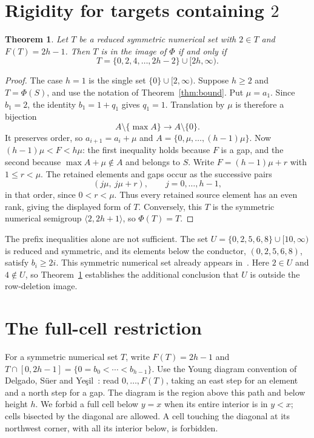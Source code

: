 \documentclass[11pt,a4paper]{article}
\newtheorem{theorem}{Theorem}
\theoremstyle{definition}
\theoremstyle{remark}
\begin{document}
\section{Rigidity for targets containing \texorpdfstring{$2$}{2}}
\begin{theorem}\label{thm:two}
Let $T$ be a reduced symmetric numerical set with $2\in T$ and
$F(T)=2h-1$. Then $T$ is in the image of $\Phi$ if and only if
\[
 T=\{0,2,4,\ldots,2h-2\}\cup[2h,\infty).
\]
\end{theorem}
\begin{proof}
The case $h=1$ is the single set $\{0\}\cup[2,\infty)$.
Suppose $h\geq2$ and $T=\Phi(S)$, and use the notation of
Theorem~\ref{thm:bound}. Put $\mu=a_1$. Since $b_1=2$, the identity
$b_1=1+q_1$ gives $q_1=1$. Translation by $\mu$ is therefore a bijection
\[
 A\setminus\{\max A\}\longrightarrow A\setminus\{0\}.
\]
It preserves order, so $a_{i+1}=a_i+\mu$ and
$A=\{0,\mu,\ldots,(h-1)\mu\}$.
Now $(h-1)\mu<F<h\mu$: the first inequality holds because $F$ is a gap,
and the second because $\max A+\mu\notin A$ and belongs to $S$.
Write $F=(h-1)\mu+r$ with $1\leq r<\mu$.
The retained elements and gaps occur as the successive pairs
\[
 (j\mu,\ j\mu+r),\qquad j=0,\ldots,h-1,
\]
in that order, since $0<r<\mu$.
Thus every retained source element has an even rank, giving the displayed
form of $T$. Conversely, this $T$ is the symmetric numerical semigroup
$\langle2,2h+1\rangle$, so $\Phi(T)=T$.
\end{proof}

The prefix inequalities alone are not sufficient. The set
$U=\{0,2,5,6,8\}\cup[10,\infty)$ is reduced and symmetric, and its
elements below the conductor, $(0,2,5,6,8)$, satisfy $b_i\geq2i$.
This symmetric numerical set already appears in~\cite[Example~5.3]{Y}.
Here $2\in U$ and $4\notin U$, so Theorem~\ref{thm:two} establishes
the additional conclusion that $U$ is outside the row-deletion image.


\section{The full-cell restriction}\label{sec:cells}
For a symmetric numerical set $T$, write $F(T)=2h-1$ and
$T\cap[0,2h-1]=\{0=b_0<\cdots<b_{h-1}\}$.
Use the Young diagram convention of Delgado, S\"uer and
Ye\c{s}il~\cite[Section~2, p.~4]{DSY}: read $0,\ldots,F(T)$,
taking an east step for an element and a north step for a gap.
The diagram is the region above this path and below height $h$.
We forbid a full cell below $y=x$ when its entire interior is in $y<x$;
cells bisected by the diagonal are allowed. A cell touching the diagonal
at its northwest corner, with all its interior below, is forbidden.
\end{document}
